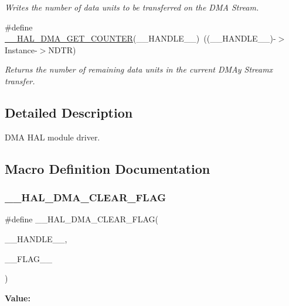 \begin{DoxyCompactItemize}
\begin{DoxyCompactList}\small\item\em Writes the number of data units to be transferred on the D\+MA Stream. \end{DoxyCompactList}\item 
\#define \mbox{\hyperlink{group___d_m_a_ga082d691311bac96641dc35a17cfe8e63}{\+\_\+\+\_\+\+H\+A\+L\+\_\+\+D\+M\+A\+\_\+\+G\+E\+T\+\_\+\+C\+O\+U\+N\+T\+ER}}(\+\_\+\+\_\+\+H\+A\+N\+D\+L\+E\+\_\+\+\_\+)~((\+\_\+\+\_\+\+H\+A\+N\+D\+L\+E\+\_\+\+\_\+)-\/$>$Instance-\/$>$N\+D\+TR)
\begin{DoxyCompactList}\small\item\em Returns the number of remaining data units in the current D\+M\+Ay Streamx transfer. \end{DoxyCompactList}\end{DoxyCompactItemize}


\subsection{Detailed Description}
D\+MA H\+AL module driver. 



\subsection{Macro Definition Documentation}
\mbox{\label{group___d_m_a_gabc041fb1c85ea7a3af94e42470ef7f2a}} 
\subsubsection{\texorpdfstring{\_\_HAL\_DMA\_CLEAR\_FLAG}{\_\_HAL\_DMA\_CLEAR\_FLAG}}
{\footnotesize\ttfamily \#define \+\_\+\+\_\+\+H\+A\+L\+\_\+\+D\+M\+A\+\_\+\+C\+L\+E\+A\+R\+\_\+\+F\+L\+AG(\begin{DoxyParamCaption}\item[{}]{\+\_\+\+\_\+\+H\+A\+N\+D\+L\+E\+\_\+\+\_\+,  }\item[{}]{\+\_\+\+\_\+\+F\+L\+A\+G\+\_\+\+\_\+ }\end{DoxyParamCaption})}

{\bfseries Value\+:}
\begin{DoxyCode}{0}

\end{DoxyCode}


